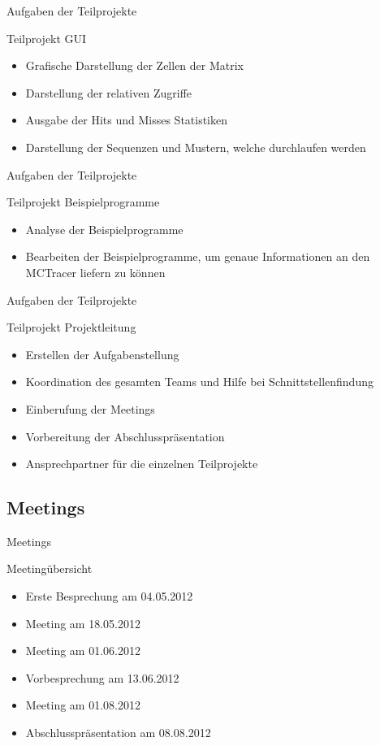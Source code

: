 \begin{frame}{Aufgaben der Teilprojekte}
\begin{block}{Teilprojekt GUI}
\begin{itemize}[<+->]
\pause\item Grafische Darstellung der Zellen der Matrix
\item Darstellung der relativen Zugriffe
\item Ausgabe der Hits und Misses Statistiken
\item Darstellung der Sequenzen und Mustern, welche durchlaufen werden
\end{itemize}
\end{block}
\end{frame}

\begin{frame}{Aufgaben der Teilprojekte}
\begin{block}{Teilprojekt Beispielprogramme}
\begin{itemize}[<+->]
\pause\item Analyse der Beispielprogramme
\item Bearbeiten der Beispielprogramme, um genaue Informationen an den MCTracer liefern zu können
\end{itemize}
\end{block}
\end{frame}

\begin{frame}{Aufgaben der Teilprojekte}
\begin{block}{Teilprojekt Projektleitung}
\begin{itemize}[<+->]
\pause\item Erstellen der Aufgabenstellung
\item Koordination des gesamten Teams und Hilfe bei Schnittstellenfindung
\item Einberufung der Meetings
\item Vorbereitung der Abschlusspräsentation
\item Ansprechpartner für die einzelnen Teilprojekte
\end{itemize}
\end{block}
\end{frame}

\subsection{Meetings}

\begin{frame}{Meetings}
\begin{block}{Meetingübersicht}
\begin{itemize}[<+->]
\pause\item Erste Besprechung am 04.05.2012
\item Meeting am 18.05.2012
\item Meeting am 01.06.2012
\item Vorbesprechung am 13.06.2012
\item Meeting am 01.08.2012
\item Abschlusspräsentation am 08.08.2012
\end{itemize}
\end{block}
\end{frame}

